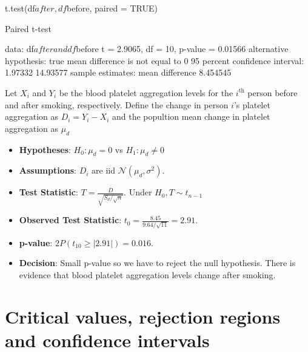 \documentclass[a4paper]{article}\usepackage[]{graphicx}\usepackage[]{xcolor}
\begin{document}
\begin{Schunk}
\begin{Sinput}
t.test(df$after, df$before, paired = TRUE)
\end{Sinput}
\begin{Soutput}

	Paired t-test

data:  df$after and df$before
t = 2.9065, df = 10, p-value = 0.01566
alternative hypothesis: true mean difference is not equal to 0
95 percent confidence interval:
  1.97332 14.93577
sample estimates:
mean difference 
       8.454545 
\end{Soutput}
\end{Schunk}
Let \( X_i \) and \( Y_i \) be the blood platelet aggregation levels for the \( i^{\text{th}} \) person before and after smoking, respectively. Define the change in person \( i \)'s platelet aggregation as \( D_i = Y_i - X_i \) and the popultion mean change in platelet aggregation as \( \mu_d \) 
\begin{itemize}
	\item \textbf{Hypotheses}: \( H_0: \mu_d = 0 \) vs \( H_1: \mu_d \neq 0 \)
	\item \textbf{Assumptions}: \( D_i \) are iid \( \mathcal{N} (\mu_d,\sigma^2) \).
	\item \textbf{Test Statistic}: \( T = \frac{\overline{D}}{\sqrt{S_d / \sqrt{n}}} \). Under \( H_0, T \sim t_{n-1} \) 
	\item \textbf{Observed Test Statistic}: \( t_0 = \frac{8.45}{9.64 / \sqrt{11}} = 2.91 \).
	\item \textbf{p-value}: \( 2P(t_{10} \geq \lvert 2.91 \rvert) = 0.016 \).
	\item \textbf{Decision}: Small p-value so we have to reject the null hypothesis. There is evidence that blood platelet aggregation levels change after smoking.
\end{itemize}
\section{Critical values, rejection regions and confidence intervals}\label{sec:11}
\end{document}
